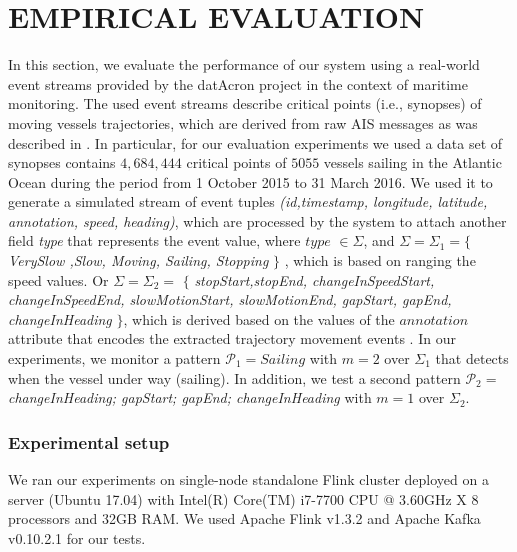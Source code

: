 \section{EMPIRICAL EVALUATION}
\label{sec:results}
In this section, we evaluate the performance of our system using a real-world event streams provided by the datAcron project in the context of maritime monitoring. The used event streams describe critical points (i.e., synopses) of moving vessels trajectories, which are derived from raw AIS messages as was  described in \cite{synopses1}. In particular, for our evaluation experiments we used a data set of synopses contains $4,684,444$ critical points of $5055$ vessels sailing in the Atlantic Ocean during the period from 1 October 2015 to 31 March 2016. We used it to generate a simulated stream of event tuples  \textit{(id,timestamp, longitude, latitude, annotation, speed, heading)}, which are processed by the system to attach another field \textit{type} that represents the event value,  where $type$ $\in \Sigma$,  and $ \Sigma= \Sigma_1=$$\{$\textit{VerySlow ,Slow, Moving, Sailing, Stopping} $\}$ , which is based on ranging the speed values. Or $\Sigma=\Sigma_2=$ $\{$  \textit{stopStart,stopEnd, changeInSpeedStart, changeInSpeedEnd, slowMotionStart, slowMotionEnd, gapStart, gapEnd,   changeInHeading} $\}$, which is derived based on the values of the $annotation$ attribute that encodes the extracted trajectory movement events \cite{synopses1}. In our experiments, we monitor a pattern $\mathcal{P}_1=Sailing$ with $m=2$ over $\Sigma_1$ that detects when the vessel under way (sailing). In addition, we test a second pattern  $\mathcal{P}_2=$\textit{changeInHeading; gapStart; gapEnd; changeInHeading} with $m=1$ over $\Sigma_2$.


\subsubsection*{Experimental setup} We ran our experiments on single-node standalone Flink cluster deployed on a server (Ubuntu 17.04) with Intel(R) Core(TM) i7-7700 CPU @ 3.60GHz X 8 processors and 32GB RAM. We used Apache Flink v1.3.2 and Apache Kafka v0.10.2.1 for our tests.



